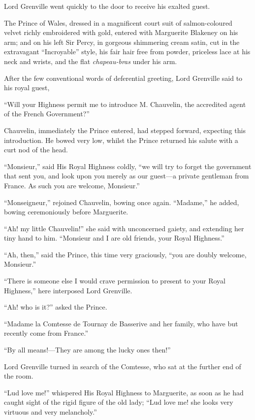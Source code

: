 Lord Grenville went quickly to the door to receive his exalted guest.

The Prince of Wales, dressed in a magnificent court suit of salmon-coloured velvet richly embroidered with gold, entered with Marguerite Blakeney on his arm; and on his left Sir Percy, in gorgeous shimmering cream satin, cut in the extravagant \enquote{Incroyable} style, his fair hair free from powder, priceless lace at his neck and wrists, and the flat \textit{chapeau-bras} under his arm.

After the few conventional words of deferential greeting, Lord Grenville said to his royal guest,\longdash


\enquote{Will your Highness permit me to introduce M. Chauvelin, the accredited agent of the French Government?}

Chauvelin, immediately the Prince entered, had stepped forward, expecting this introduction. He bowed very low, whilst the Prince returned his salute with a curt nod of the head.

\enquote{Monsieur,} said His Royal Highness coldly, \enquote{we will try to forget the government that sent you, and look upon you merely as our guest---a private gentleman from France. As such you are welcome, Monsieur.}

\enquote{Monseigneur,} rejoined Chauvelin, bowing once again. \enquote{Madame,} he added, bowing ceremoniously before Marguerite.

\enquote{Ah! my little Chauvelin!} she said with unconcerned gaiety, and extending her tiny hand to him. \enquote{Monsieur and I are old friends, your Royal Highness.}

\enquote{Ah, then,} said the Prince, this time very graciously, \enquote{you are doubly welcome, Monsieur.}

\enquote{There is someone else I would crave permission to present to your Royal Highness,} here interposed Lord Grenville.

\enquote{Ah! who is it?} asked the Prince.

\enquote{Madame la Comtesse de Tournay de Basserive and her family, who have but recently come from France.}

\enquote{By all means!---They are among the lucky ones then!}

Lord Grenville turned in search of the Comtesse, who sat at the further end of the room.

\enquote{Lud love me!} whispered His Royal Highness to Marguerite, as soon as he had caught sight of the rigid figure of the old lady; \enquote{Lud love me! she looks very virtuous and very melancholy.}

